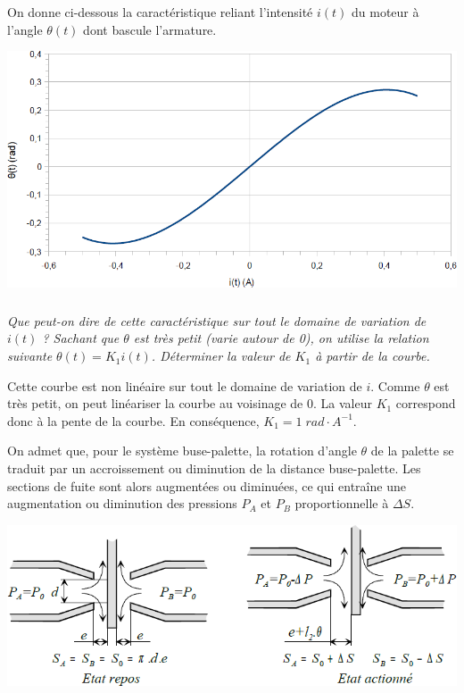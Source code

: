 \documentclass[10pt,fleqn]{article} %
\begin{document}
\begin{multicols}{2}
On donne ci-dessous la caractéristique reliant l'intensité $i(t)$ du moteur à l'angle $\theta(t)$ dont bascule l'armature.

\begin{center}
\includegraphics[width=.8\linewidth]{images/image8.png}
\end{center}

\fi



\subparagraph{}
\textit{Que peut-on dire de cette caractéristique sur tout le domaine de variation de $i(t)$ ? Sachant que $\theta$ est très petit (varie autour de 0), on utilise la relation suivante $\theta(t)=K_1i(t)$.  Déterminer la valeur de $K_1$ à partir de la courbe.}

\ifprof
\begin{corrige}
Cette courbe est non linéaire sur tout le domaine de variation de $i$. Comme
$\theta$ est très petit, on peut linéariser la courbe au voisinage de 0. La
valeur $K_1$ correspond donc à la pente  de la courbe. En conséquence,
$K_1=1\;rad\cdot A^{-1}$. 
\end{corrige}
\else 


On admet que, pour le système buse-palette, la rotation d'angle $\theta$ de la palette se traduit par un
accroissement ou diminution de la distance buse-palette. Les sections de fuite sont alors augmentées ou
diminuées, ce qui entraîne une augmentation ou diminution des pressions $P_A$ et $P_B$ proportionnelle à
$\Delta S$.

\begin{center}
\includegraphics[width=.8\linewidth]{images/image9.png}
\end{center}


\end{multicols}
\end{document}
